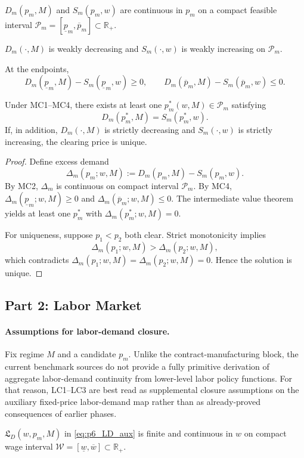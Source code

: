 \begin{assumption}[MC2: Continuity in $p_m$]
$D_m(p_m,M)$ and $S_m(p_m,w)$ are continuous in $p_m$ on a compact feasible interval $\mathcal P_m=[\underline p_m,\overline p_m]\subset\mathbb R_+$.
\end{assumption}

\begin{assumption}[MC3: Monotonicity]
$D_m(\cdot,M)$ is weakly decreasing and $S_m(\cdot,w)$ is weakly increasing on $\mathcal P_m$.
\end{assumption}

\begin{assumption}
At the endpoints,
\[
D_m(\underline p_m,M)-S_m(\underline p_m,w)\ge 0,
\qquad
D_m(\overline p_m,M)-S_m(\overline p_m,w)\le 0.
\]
\end{assumption}

\begin{proposition}
Under MC1--MC4, there exists at least one $p_m^*(w,M)\in\mathcal P_m$ satisfying
\[
D_m(p_m^*,M)=S_m(p_m^*,w).
\]
If, in addition, $D_m(\cdot,M)$ is strictly decreasing and $S_m(\cdot,w)$ is strictly increasing, the clearing price is unique.
\end{proposition}

\begin{proof}
Define excess demand
\[
\Delta_m(p_m;w,M):=D_m(p_m,M)-S_m(p_m,w).
\]
By MC2, $\Delta_m$ is continuous on compact interval $\mathcal P_m$. By MC4, $\Delta_m(\underline p_m;w,M)\ge 0$ and $\Delta_m(\overline p_m;w,M)\le 0$. The intermediate value theorem yields at least one $p_m^*$ with $\Delta_m(p_m^*;w,M)=0$.

For uniqueness, suppose $p_1<p_2$ both clear. Strict monotonicity implies
\[
\Delta_m(p_1;w,M)>\Delta_m(p_2;w,M),
\]
which contradicts $\Delta_m(p_1;w,M)=\Delta_m(p_2;w,M)=0$. Hence the solution is unique.
\end{proof}

\subsection{Part 2: Labor Market}

\paragraph{Assumptions for labor-demand closure.}
Fix regime $M$ and a candidate $p_m$.
Unlike the contract-manufacturing block, the current benchmark sources do not provide a fully primitive derivation of aggregate labor-demand continuity from lower-level labor policy functions. For that reason, LC1--LC3 are best read as supplemental closure assumptions on the auxiliary fixed-price labor-demand map rather than as already-proved consequences of earlier phases.
\begin{assumption}
$\mathfrak L_D(w,p_m,M)$ in \eqref{eq:p6_LD_aux} is finite and continuous in $w$ on compact wage interval $\mathcal W=[\underline w,\overline w]\subset\mathbb R_+$.
\end{assumption}

